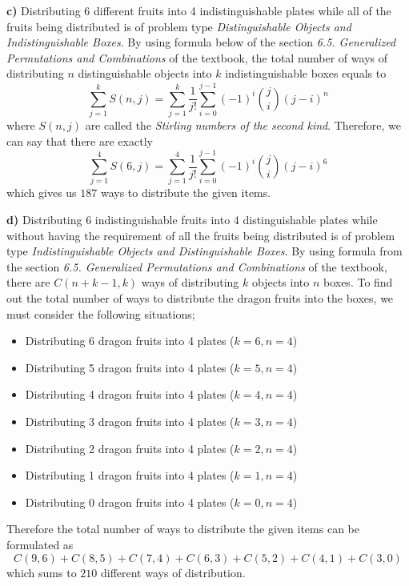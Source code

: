 \documentclass[12pt]{article}
\begin{document}
\begin{enumerate}
\textbf{c)} Distributing 6 different fruits into 4 indistinguishable plates while all of the fruits being distributed is of problem type \textit{Distinguishable Objects and Indistinguishable Boxes}. By using formula below of the section \textit{6.5. Generalized Permutations and Combinations} of the textbook, the total number of ways of distributing $n$ distinguishable objects into $k$ indistinguishable boxes equals to
$$\sum\limits_{j=1}^{k} S(n,j) = \sum\limits_{j=1}^{k} \dfrac{1}{j!} \sum\limits_{i=0}^{j-1} (-1)^i {j\choose{i}}  (j-i)^n $$
where $S(n,j)$ are called the \textit{Stirling numbers of the second kind}.
Therefore, we can say that there are exactly 
$$\sum\limits_{j=1}^{4} S(6,j) = \sum\limits_{j=1}^{4} \dfrac{1}{j!} \sum\limits_{i=0}^{j-1} (-1)^i {j\choose{i}}  (j-i)^6 $$
which gives us $187$ ways to distribute the given items. 

\textbf{d)} Distributing 6 indistinguishable fruits into 4 distinguishable plates while without having the requirement of all the fruits being distributed is of problem type \textit{Indistinguishable Objects and Distinguishable Boxes}. By using formula from the section \textit{6.5. Generalized Permutations and Combinations} of the textbook, there are $C(n+k-1,k)$ ways of distributing $k$ objects into $n$ boxes. To find out the total number of ways to distribute the dragon fruits into the boxes, we must consider the following situations;
\begin{itemize}
    \item Distributing 6 dragon fruits into 4 plates ($k=6, n=4$)
    \item Distributing 5 dragon fruits into 4 plates ($k=5, n=4$)
    \item Distributing 4 dragon fruits into 4 plates ($k=4, n=4$)
    \item Distributing 3 dragon fruits into 4 plates ($k=3, n=4$)
    \item Distributing 2 dragon fruits into 4 plates ($k=2, n=4$)
    \item Distributing 1 dragon fruits into 4 plates ($k=1, n=4$)
    \item Distributing 0 dragon fruits into 4 plates ($k=0, n=4$)
\end{itemize}
Therefore the total number of ways to distribute the given items can be formulated as
$$ C(9,6) + C(8,5) + C(7,4) + C(6,3) + C(5,2) + C(4,1) + C(3,0)$$ 
which sums to $210$ different ways of distribution.


\end{enumerate}
\end{document}
